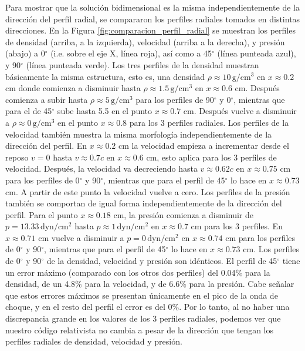 \documentclass[12pt,a4paper]{book}
\begin{document}
Para mostrar que la solución bidimensional es la misma independientemente de la dirección del perfil radial, se compararon los perfiles radiales tomados en distintas direcciones. En la Figura 
\ref{fig:comparacion_perfil_radial} se muestran los perfiles de densidad (arriba, a la izquierda), velocidad (arriba a la derecha), y presión (abajo) a 0$^{\circ}$ (i.e. sobre el eje X, línea roja), así como a 
45$^{\circ}$ (línea punteada azul), y 90$^{\circ}$ (línea punteada verde). Los tres perfiles de la densidad muestran básicamente la misma estructura, esto es, una densidad $\rho \approx 10 \, \text{g}/\text{cm}^3$ 
en $x \approx 0.2$ cm donde comienza a disminuir hasta $\rho \approx 1.5 \, \text{g}/\text{cm}^3$ en $x \approx 0.6$ cm. Después comienza a subir hasta $\rho \approx 5 \, \text{g}/\text{cm}^3$ para los perfiles de 90$^{\circ}$ 
y 0$^{\circ}$, mientras que para el de 45$^{\circ}$ sube hasta 5.5 en el punto $x \approx 0.7$ cm. Después vuelve a disminuir a $\rho \approx 0 \, \text{g}/\text{cm}^3$ en el punto $x \approx 0.8$ para los 3 perfiles 
radiales.
Los perfiles de la velocidad también muestra la misma morfología independientemente de la dirección del perfil. En $x \approx 0.2$ cm la velocidad empieza a incrementar desde el reposo $v = 0$ hasta $v \approx 0.7c$ 
en $x \approx 0.6$ cm, esto aplica para los 3 perfiles de velocidad. Después, la velocidad va decreciendo hasta $v \approx 0.62c$ en $x \approx 0.75$ cm para los perfiles de 0$^{\circ}$ y 90$^{\circ}$, mientras que 
para el perfil de 45$^{\circ}$ lo hace en $x \approx 0.73$ cm. A partir de este punto la velocidad vuelve a cero.
Los perfiles de la presión también se comportan de igual forma independientemente de la dirección del perfil. Para el punto $x \approx 0.18$ cm, la presión comienza a disminuir de $p = 13.33 \,  \text{dyn}/ \text{cm}^2$ 
hasta $p \approx 1 \,  \text{dyn}/ \text{cm}^2$ en $x \approx 0.7$ cm para los 3 perfiles. En $x \approx 0.71 $ cm vuelve a disminuir a $p = 0 \,  \text{dyn}/ \text{cm}^2$ en $x \approx 0.74 $ cm para los perfiles de 
0$^{\circ}$ y 90$^{\circ}$, mientras que para el perfil de 45$^{\circ}$ lo hace en $x \approx 0.73 $ cm.
Los perfiles de 0$^{\circ}$ y 90$^{\circ}$ de la densidad, velocidad y presión son idénticos. El perfil de 45$^{\circ}$ tiene un error máximo (comparado con los otros dos perfiles) del 0.04\% para la densidad, 
de un 4.8\% para la velocidad, y de 6.6\% para la presión. Cabe señalar que estos errores máximos se presentan únicamente en el pico de la onda de choque, y en el resto del perfil el error es del 0\%. Por lo tanto, 
al no haber una discrepancia grande en los valores de los 3 perfiles radiales, podemos ver que nuestro código relativista no cambia a pesar de la dirección que tengan los perfiles radiales de  densidad, velocidad y presión.
\end{document}
